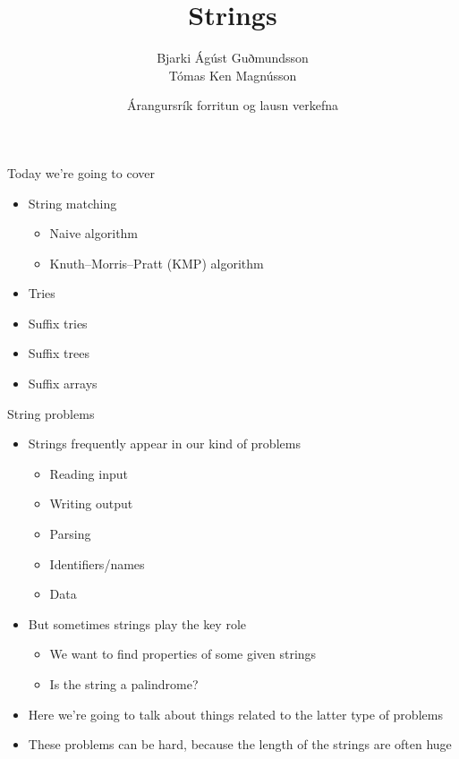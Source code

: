 \documentclass[12pt,t]{beamer}
\title{Strings}
\author{Bjarki Ágúst Guðmundsson \\ Tómas Ken Magnússon}
\institute{\href{http://ru.is/td}{School of Computer Science} \\[2pt] \href{http://ru.is}{Reykjavík University}}
\date{Árangursrík forritun og lausn verkefna}
\newcommand{\bi}{\begin{itemize}}
\newcommand{\ei}{\end{itemize}}
\begin{document}
{
    \frame{
        \titlepage
    }
}


\begin{frame}{Today we're going to cover}
    \vspace{40pt}
    \bi
        \item String matching
            \bi
                \item Naive algorithm
                \item Knuth--Morris--Pratt (KMP) algorithm
            \ei
        \item Tries
        \item Suffix tries
        \item Suffix trees
        \item Suffix arrays
    \ei
\end{frame}

\begin{frame}{String problems}
    \vspace{10pt}
    \bi
        \item Strings frequently appear in our kind of problems
            \bi
                \item Reading input
                \item Writing output
                \item Parsing
                \item Identifiers/names
                \item Data
            \ei
        \vspace{5pt}
        \item But sometimes strings play the key role
            \bi
                \item We want to find properties of some given strings
                \item Is the string a palindrome?
            \ei
        \vspace{5pt}
        \item Here we're going to talk about things related to the latter type of problems
        \vspace{5pt}
        \item These problems can be hard, because the length of the strings are often huge
    \ei
\end{frame}

\end{document}

